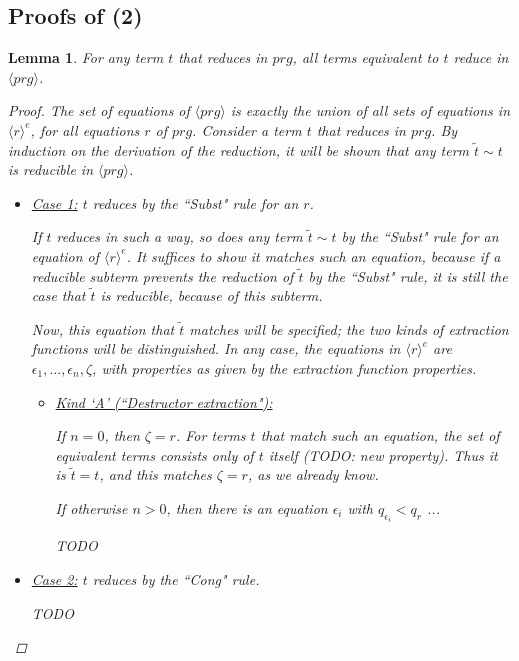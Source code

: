 \documentclass[11pt]{article} %
\newtheorem{lemma}{Lemma}
\begin{document}
\subsection{Proofs of (2)}


\begin{lemma}

For any term $t$ that reduces in $prg$, all terms equivalent to $t$ reduce in $\langle prg \rangle$.

\begin{proof}

The set of equations of $\langle prg \rangle$ is exactly the union of all sets of equations in $\langle r \rangle^e$, for all equations $r$ of $prg$. Consider a term $t$ that reduces in $prg$. By induction on the derivation of the reduction, it will be shown that any term $\widetilde{t} \sim t$ is reducible in $\langle prg \rangle$.

\begin{itemize}
\item \underline{Case 1:} $t$ reduces by the ``Subst" rule for an $r$.

If $t$ reduces in such a way, so does any term $\widetilde{t} \sim t$ by the ``Subst" rule for an equation of $\langle r \rangle^e$. It suffices to show it matches such an equation, because if a reducible subterm prevents the reduction of $\widetilde{t}$ by the ``Subst" rule, it is still the case that $\widetilde{t}$ is reducible, because of this subterm.

Now, this equation that $\widetilde{t}$ matches will be specified; the two kinds of extraction functions will be distinguished. In any case, the equations in $\langle r \rangle^e$ are $\epsilon_1, ..., \epsilon_n, \zeta$, with properties as given by the extraction function properties.

\begin{itemize}
\item \underline{Kind `A' (``Destructor extraction"):}

If $n = 0$, then $\zeta = r$. For terms $t$ that match such an equation, the set of equivalent terms consists only of $t$ itself (TODO: new property). Thus it is $\widetilde{t} = t$, and this matches $\zeta = r$, as we already know.

If otherwise $n > 0$, then there is an equation $\epsilon_i$ with $q_{\epsilon_i} < q_r$ ...

TODO

\end{itemize}

\item \underline{Case 2:} $t$ reduces by the ``Cong" rule.

TODO

\end{itemize}

\end{proof}

\end{lemma}
\end{document}
